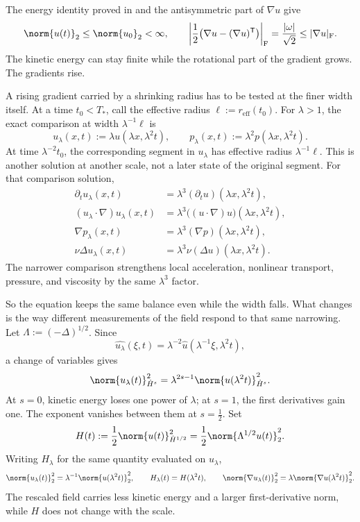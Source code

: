 The energy identity proved in  and the antisymmetric part of \(\nabla u\) give
\[
  \norm{u(t)}_2
  \leq
  \norm{u_0}_2
  <\infty,
  \qquad
  \left|\frac12\bigl(\nabla u-(\nabla u)^{\mathsf T}\bigr)\right|_{\mathrm F}
  =
  \frac{|\omega|}{\sqrt2}
  \leq
  |\nabla u|_{\mathrm F}.
\]
The kinetic energy can stay finite while the rotational part of the gradient grows. The gradients rise.


A rising gradient carried by a shrinking radius has to be tested at the finer width itself. At a time \(t_0<T_*\), call the effective radius \(\ell:=r_{\mathrm{eff}}(t_0)\). For \(\lambda>1\), the exact \NavierStokes{} comparison at width \(\lambda^{-1}\ell\) is
\[
  u_\lambda(x,t)
  :=
  \lambda u(\lambda x,\lambda^2t),
  \qquad
  p_\lambda(x,t)
  :=
  \lambda^2p(\lambda x,\lambda^2t).
\]
At time \(\lambda^{-2}t_0\), the corresponding segment in \(u_\lambda\) has effective radius \(\lambda^{-1}\ell\). This is another solution at another scale, not a later state of the original segment. For that comparison solution,
\[
\begin{aligned}
  \partial_tu_\lambda(x,t)
  &=
  \lambda^3(\partial_tu)(\lambda x,\lambda^2t),
  \\
  (u_\lambda\cdot\nabla)u_\lambda(x,t)
  &=
  \lambda^3\bigl((u\cdot\nabla)u\bigr)(\lambda x,\lambda^2t),
  \\
  \nabla p_\lambda(x,t)
  &=
  \lambda^3(\nabla p)(\lambda x,\lambda^2t),
  \\
  \nu\Delta u_\lambda(x,t)
  &=
  \lambda^3\nu(\Delta u)(\lambda x,\lambda^2t).
\end{aligned}
\]
The narrower comparison strengthens local acceleration, nonlinear transport, pressure, and viscosity by the same \(\lambda^3\) factor.


So the equation keeps the same balance even while the width falls. What changes is the way different measurements of the field respond to that same narrowing. Let \(\Lambda:=(-\Delta)^{1/2}\). Since
\[
  \widehat{u_\lambda}(\xi,t)
  =
  \lambda^{-2}\widehat u(\lambda^{-1}\xi,\lambda^2t),
\]
a change of variables gives
\[
  \norm{u_\lambda(t)}_{\dot H^s}^2
  =
  \lambda^{2s-1}
  \norm{u(\lambda^2t)}_{\dot H^s}^2.
\]
At \(s=0\), kinetic energy loses one power of \(\lambda\); at \(s=1\), the first derivatives gain one. The exponent vanishes between them at \(s=\tfrac12\). Set
\[
  H(t)
  :=
  \frac12\norm{u(t)}_{\dot H^{1/2}}^2
  =
  \frac12\norm{\Lambda^{1/2}u(t)}_2^2.
\]
Writing \(H_\lambda\) for the same quantity evaluated on \(u_\lambda\),
\[
  \norm{u_\lambda(t)}_2^2
  =
  \lambda^{-1}\norm{u(\lambda^2t)}_2^2,
  \qquad
  H_\lambda(t)=H(\lambda^2t),
  \qquad
  \norm{\nabla u_\lambda(t)}_2^2
  =
  \lambda\norm{\nabla u(\lambda^2t)}_2^2.
\]
The rescaled field carries less kinetic energy and a larger first-derivative norm, while \(H\) does not change with the scale.

